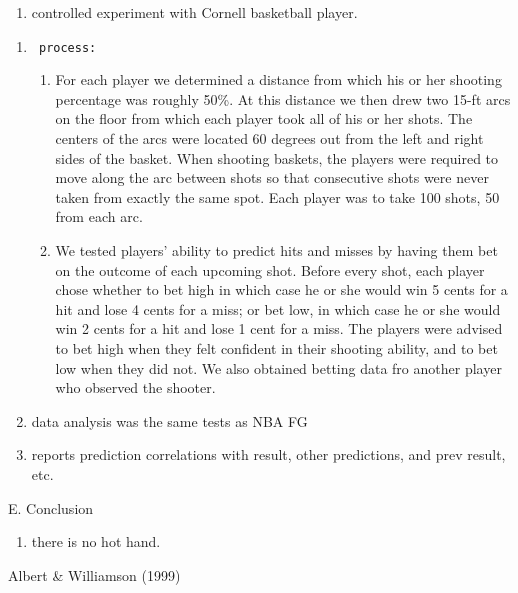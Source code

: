 \documentclass[12pt,twoside]{dukestatscithesis}
\providecommand{\tightlist}{%
  \setlength{\itemsep}{0pt}\setlength{\parskip}{0pt}}
\theoremstyle{definition}
\theoremstyle{definition}
\theoremstyle{definition}
\theoremstyle{remark}
\begin{document}
\begin{enumerate}
\def\labelenumi{\Alph{enumi}.}
\setcounter{enumi}{3}
\tightlist
\item
  controlled experiment with Cornell basketball player.
\end{enumerate}
\begin{enumerate}
\def\labelenumi{\arabic{enumi}.}
\item
\begin{verbatim}
 process:
\end{verbatim}
  \begin{enumerate}
  \def\labelenumii{\alph{enumii}.}
  \item
    For each player we determined a distance from which his or her
    shooting percentage was roughly 50\%. At this distance we then drew
    two 15-ft arcs on the floor from which each player took all of his
    or her shots. The centers of the arcs were located 60 degrees out
    from the left and right sides of the basket. When shooting baskets,
    the players were required to move along the arc between shots so
    that consecutive shots were never taken from exactly the same spot.
    Each player was to take 100 shots, 50 from each arc.
  \item
    We tested players' ability to predict hits and misses by having them
    bet on the outcome of each upcoming shot. Before every shot, each
    player chose whether to bet high in which case he or she would win 5
    cents for a hit and lose 4 cents for a miss; or bet low, in which
    case he or she would win 2 cents for a hit and lose 1 cent for a
    miss. The players were advised to bet high when they felt confident
    in their shooting ability, and to bet low when they did not. We also
    obtained betting data fro another player who observed the shooter.
  \end{enumerate}
\item
  data analysis was the same tests as NBA FG
\item
  reports prediction correlations with result, other predictions, and
  prev result, etc.
\end{enumerate}
E. Conclusion
\begin{enumerate}
\def\labelenumi{\arabic{enumi}.}
\tightlist
\item
  there is no hot hand.
\end{enumerate}
Albert \& Williamson (1999)
\end{document}
